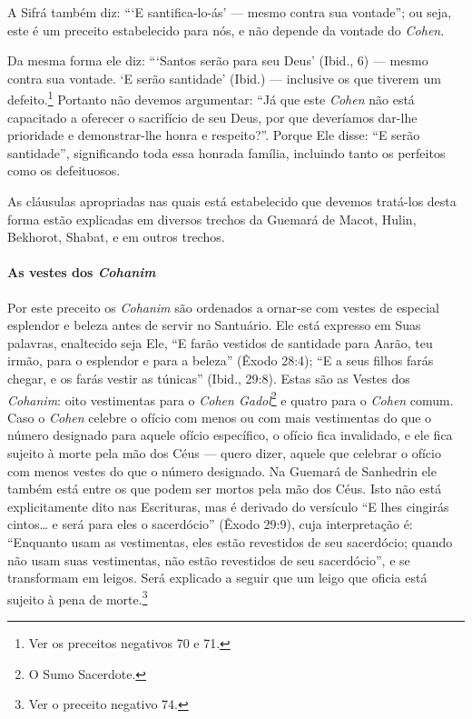 A Sifrá também diz: ```E santifica-lo-ás' --- mesmo contra sua
vontade''; ou seja, este é um preceito estabelecido para nós, e não
depende da vontade do \textit{Cohen}.

Da mesma forma ele diz: ```Santos serão para seu Deus' (Ibid., 6) ---
mesmo contra sua vontade. `E serão santidade' (Ibid.) --- inclusive os
que tiverem um defeito.\footnote{Ver os preceitos negativos 70 e 71.} Portanto não devemos argumentar:
``Já que este \textit{Cohen} não está capacitado a oferecer o sacrifício de seu Deus, por que deveríamos dar-lhe prioridade e demonstrar-lhe honra e respeito?''. Porque Ele
disse: ``E serão santidade'', significando toda essa honrada família, incluindo tanto os
perfeitos como os defeituosos.

As cláusulas apropriadas nas quais está estabelecido que devemos
tratá-los desta forma estão explicadas em diversos trechos da Guemará de
Macot, Hulin, Bekhorot, Shabat, e em outros trechos.

\paragraph{As vestes dos \textit{Cohanim}}


Por este preceito os \textit{Cohanim} são ordenados a ornar-se com vestes de
especial esplendor e beleza antes de servir no Santuário. Ele está
expresso em Suas palavras, enaltecido seja Ele, ``E farão vestidos de
santidade para Aarão, teu irmão, para o esplendor e para a beleza'' (Êxodo 28:4); ``E a
seus filhos farás chegar, e os farás vestir as túnicas'' (Ibid., 29:8). Estas
são as Vestes dos \textit{Cohanim}: oito vestimentas para o \textit{Cohen
Gadol}\footnote{O Sumo Sacerdote.} e quatro para o
\textit{Cohen} comum. Caso o \textit{Cohen} celebre o ofício com menos ou com mais
vestimentas do que o número designado para aquele ofício específico, o
ofício fica invalidado, e ele fica sujeito à morte pela mão dos Céus ---
quero dizer, aquele que celebrar o ofício com menos vestes do que o
número designado. Na Guemará de Sanhedrin ele também está entre os que
podem ser mortos pela mão dos Céus. Isto não está explicitamente dito
nas Escrituras, mas é derivado do versículo ``E lhes cingirás cintos\ldots{}
e será para eles o sacerdócio'' (Êxodo 29:9), cuja interpretação é:
``Enquanto usam as vestimentas, eles estão revestidos de seu sacerdócio; quando não usam suas vestimentas, não estão
revestidos de seu sacerdócio'', e se transformam em leigos. Será explicado a
seguir que um leigo que oficia está sujeito à pena de
morte.\footnote{Ver o preceito negativo 74.}

